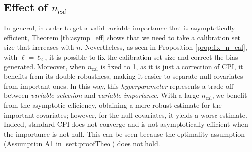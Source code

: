 \documentclass{article}
\theoremstyle{plain}
\theoremstyle{definition}
\theoremstyle{remark}
\begin{document}
    




\subsection{Effect of $n_\mathrm{cal}$}\label{subsec:exp-n-cal}

In general, in order to get a valid variable importance that is asymptotically efficient, Theorem \ref{th:asymp_eff} shows that we need to take a calibration set size that increases with $n$. Nevertheless, as seen in Proposition \ref{prop:fix_n_cal}, with $\ell=\ell_2$, it is possible to fix the calibration set size and correct the bias generated. Moreover, when $n_\mathrm{cal}$ is fixed to 1, as it is just a correction of CPI, it benefits from its double robustness, making it easier to separate null covariates from important ones. In this way, this \textit{hyperparameter} represents a trade-off between \textit{variable selection} and \textit{variable importance}. With a large $n_\mathrm{cal}$, we benefit from the asymptotic efficiency, obtaining a more robust estimate for the important covariates; however, for the null covariates, it yields a worse estimate. Indeed, standard CPI does not converge and is not asymptotically efficient when the importance is not null. This can be seen because the optimality assumption (Assumption A1 in \cref{sect:proofTheo}) does not hold. 
\end{document}

